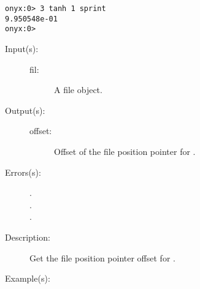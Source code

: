 \begin{description}
\begin{description}
\begin{verbatim}
onyx:0> 3 tanh 1 sprint
9.950548e-01
onyx:0>
		\end{verbatim}
 	\end{description}
\label{systemdict:tell}
\item[{\onyxop{file}{tell}{offset}}: ]
	\begin{description}\item[]
	\item[Input(s): ]
		\begin{description}\item[]
		\item[fil: ]
			A file object.
		\end{description}
	\item[Output(s): ]
		\begin{description}\item[]
		\item[offset: ]
			Offset of the file position pointer for .
		\end{description}
	\item[Errors(s): ]
		\begin{description}\item[]
		\item[.]
		\item[.]
		\item[.]
		\end{description}
	\item[Description: ]
		Get the file position pointer offset for .
	\item[Example(s): ]\begin{verbatim}


\end{verbatim}
\end{description}
\end{description}
